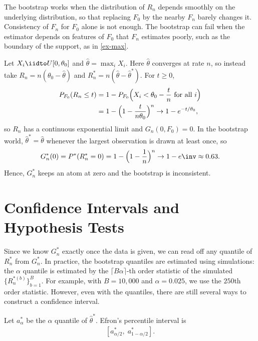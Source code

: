 \documentclass[a4paper,12pt]{article}
\begin{document}
\begin{remark}
	The bootstrap works when the distribution of $R_n$ depends smoothly on the underlying distribution,
	so that replacing $F_0$ by the nearby $F_n$ barely changes it.
	Consistency of $F_n$ for $F_0$ alone is not enough.
	The bootstrap can fail when the estimator depends on features of $F_0$ that $F_n$ estimates poorly,
	such as the boundary of the support, as in \autoref{ex-max}.
\end{remark}

\begin{example}\label{ex-max}
	Let $X_i\iidto U[0,\theta_0]$ and $\widehat\theta=\max_iX_i$.
	Here $\widehat\theta$ converges at rate $n$,
	so instead take $R_n=n(\theta_0-\widehat\theta)$ and $R_n^*=n(\widehat\theta-\widehat\theta^*)$.
	For $t\ge0$,
	\begin{align}
		P_{F_0}(R_n\le t)
		&=1-P_{F_0}\Bigl(X_i<\theta_0-\frac tn\ \text{for all}\ i\Bigr) \\
		&=1-\Bigl(1-\frac t{n\theta_0}\Bigr)^n
		\to1-e^{-t/\theta_0},
	\end{align}
	so $R_n$ has a continuous exponential limit and $G_n(0,F_0)=0$.
	In the bootstrap world, $\widehat\theta^*=\widehat\theta$ whenever the largest observation is drawn at least once, so
	\begin{align}
		G_n^*(0)=P^*(R_n^*=0)=1-\Bigl(1-\frac1n\Bigr)^n\to1-e\inv\approx0.63.
	\end{align}
	Hence, $G_n^*$ keeps an atom at zero and the bootstrap is inconsistent.
\end{example}

\section{Confidence Intervals and Hypothesis Tests}

Since we know $G_n^*$ exactly once the data is given, we can read off any quantile of $R_n^*$ from $G_n^*$.
In practice, the bootstrap quantiles are estimated using simulations:
the $\alpha$ quantile is estimated by the $\lceil B\alpha\rceil$-th order statistic of the simulated $\{R_n^{*(b)}\}_{b=1}^{B}$.
For example, with $B=10{,}000$ and $\alpha=0.025$, we use the $250$th order statistic.
However, even with the quantiles, there are still several ways to construct a confidence interval.

\begin{definition}
	Let $a_\alpha^*$ be the $\alpha$ quantile of $\widehat\theta^*$.
	Efron's percentile interval is
	\begin{align}
		\left[a_{\alpha/2}^*,\;a_{1-\alpha/2}^*\right].
	\end{align}
\end{definition}
\end{document}
